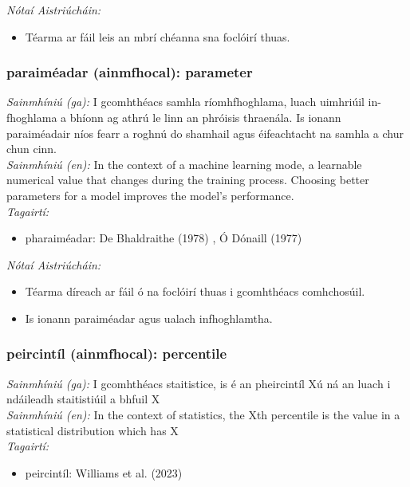  \noindent \textit{Nótaí Aistriúcháin:}
\begin{itemize}
	\item Téarma ar fáil leis an mbrí chéanna sna foclóirí thuas.
\end{itemize}


\subsubsection*{paraiméadar (ainmfhocal): parameter}
 \noindent \textit{Sainmhíniú (ga):} I gcomhthéacs samhla ríomhfhoghlama, luach uimhriúil in-fhoghlama a bhíonn ag athrú le linn an phróisis thraenála. Is ionann paraiméadair níos fearr a roghnú do shamhail agus éifeachtacht na samhla a chur chun cinn.
\\
 \noindent \textit{Sainmhíniú (en):} In the context of a machine learning mode, a learnable numerical value that changes during the training process. Choosing better parameters for a model improves the model's performance.
\\
 \noindent \textit{Tagairtí:}
\begin{itemize}
	\item pharaiméadar: De Bhaldraithe (1978) \cite{de-bhaldraithe}, Ó Dónaill (1977) \cite{odonaill}
\end{itemize}

 \noindent \textit{Nótaí Aistriúcháin:}
\begin{itemize}
	\item Téarma díreach ar fáil ó na foclóirí thuas i gcomhthéacs comhchosúil.
	\item Is ionann paraiméadar agus ualach infhoghlamtha.
\end{itemize}


\subsubsection*{peircintíl (ainmfhocal): percentile}
 \noindent \textit{Sainmhíniú (ga):} I gcomhthéacs staitistice, is é an pheircintíl Xú ná an luach i ndáileadh staitistiúil a bhfuil X%
\\
 \noindent \textit{Sainmhíniú (en):} In the context of statistics, the Xth percentile is the value in a statistical distribution which has X%
\\
 \noindent \textit{Tagairtí:}
\begin{itemize}
	\item peircintíl: Williams et al. (2023) \cite{storchiste}
\end{itemize}

